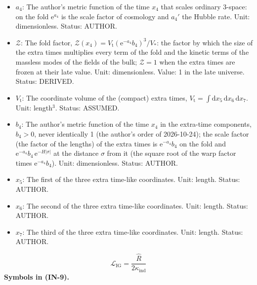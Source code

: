 \documentclass[
  10pt,
]{article}
\begin{document}
\begin{itemize}
  \(\mathrm{e}\): Euler's number, the base of the natural logarithm;
  \(\mathrm{e}^{X}\) is the exponential of \(X\). Unit: dimensionless.
  Value: 2.718281828. Status: STANDARD.
\item
  \(a_4\): The author's metric function of the time \(x_4\) that scales
  ordinary 3-space: on the fold \(\mathrm{e}^{a_4}\) is the scale factor
  of cosmology and \(a_4'\) the Hubble rate. Unit: dimensionless.
  Status: AUTHOR.
\item
  \(\mathcal{Z}\): The fold factor,
  \(\mathcal{Z}(x_4) = V_{\mathrm{t}}(\mathrm{e}^{-a_4}b_4)^3/V_*\): the
  factor by which the size of the extra times multiplies every term of
  the fold and the kinetic terms of the massless modes of the fields of
  the bulk; \(\mathcal{Z} = 1\) when the extra times are frozen at their
  late value. Unit: dimensionless. Value: 1 in the late universe.
  Status: DERIVED.
\item
  \(V_{\mathrm{t}}\): The coordinate volume of the (compact) extra
  times,
  \(V_{\mathrm{t}} = \int\mathrm{d}x_5\,\mathrm{d}x_6\,\mathrm{d}x_7\).
  Unit: length\(^3\). Status: ASSUMED.
\item
  \(b_4\): The author's metric function of the time \(x_4\) in the
  extra-time components, \(b_4 > 0\), never identically 1 (the author's
  order of 2026-10-24); the scale factor (the factor of the lengths) of
  the extra times is \(\mathrm{e}^{-a_4}b_4\) on the fold and
  \(\mathrm{e}^{-a_4}b_4\,\mathrm{e}^{-H\lvert\sigma\rvert}\) at the
  distance \(\sigma\) from it (the square root of the warp factor times
  \(\mathrm{e}^{-a_4}b_4\)). Unit: dimensionless. Status: AUTHOR.
\item
  \(x_5\): The first of the three extra time-like coordinates. Unit:
  length. Status: AUTHOR.
\item
  \(x_6\): The second of the three extra time-like coordinates. Unit:
  length. Status: AUTHOR.
\item
  \(x_7\): The third of the three extra time-like coordinates. Unit:
  length. Status: AUTHOR.
\end{itemize}

\[
\mathcal{L}_{\mathrm{IG}} = \frac{\hat R}{2\kappa_{\mathrm{ind}}} \tag{IN-9}
\] \textbf{Symbols in (IN-9).}
\end{document}
